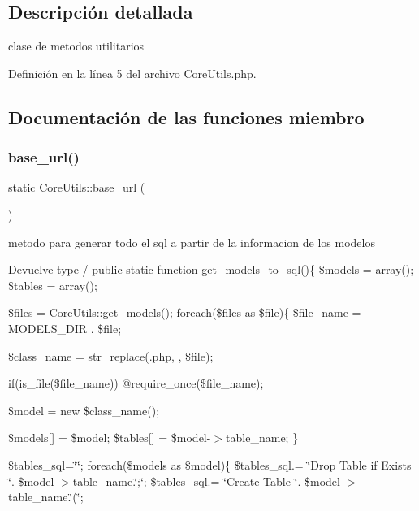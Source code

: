 \subsection{Descripción detallada}
clase de metodos utilitarios 

Definición en la línea 5 del archivo Core\+Utils.\+php.



\subsection{Documentación de las funciones miembro}
\mbox{\label{class_core_utils_adcf62251d03ae5b1095544507fb63375}} 
\subsubsection{\texorpdfstring{base\_url()}{base\_url()}}
{\footnotesize\ttfamily static Core\+Utils\+::base\+\_\+url (\begin{DoxyParamCaption}{ }\end{DoxyParamCaption})\hspace{0.3cm}{\ttfamily [static]}}

metodo para generar todo el sql a partir de la informacion de los modelos

\begin{DoxyReturn}{Devuelve}
type / public static function get\+\_\+models\+\_\+to\+\_\+sql()\{ \$models = array(); \$tables = array();
\end{DoxyReturn}
\$files = \mbox{\hyperlink{class_core_utils_a10ac6261e9a04457430db1f22d2321f9}{Core\+Utils\+::get\+\_\+models()}}; foreach(\$files as \$file)\{ \$file\+\_\+name = M\+O\+D\+E\+L\+S\+\_\+\+D\+IR . \$file;

\$class\+\_\+name = str\+\_\+replace(\textquotesingle{}.php\textquotesingle{}, \textquotesingle{}\textquotesingle{}, \$file);

if(is\+\_\+file(\$file\+\_\+name)) @require\+\_\+once(\$file\+\_\+name);

\$model = new \$class\+\_\+name();

\$models\mbox{[}\mbox{]} = \$model; \$tables\mbox{[}\mbox{]} = \$model-\/$>$table\+\_\+name; \}

\$tables\+\_\+sql=\char`\"{}\char`\"{}; foreach(\$models as \$model)\{ \$tables\+\_\+sql.= \char`\"{}\+Drop Table if Exists \char`\"{}. \$model-\/$>$table\+\_\+name.\char`\"{};\char`\"{}; \$tables\+\_\+sql.= \char`\"{}\+Create Table \char`\"{}. \$model-\/$>$table\+\_\+name.\char`\"{}(\char`\"{};


